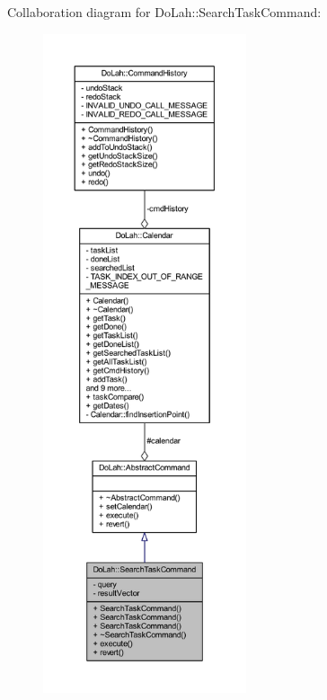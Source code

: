 Collaboration diagram for Do\+Lah\+:\+:Search\+Task\+Command\+:\nopagebreak
\begin{figure}[H]
\begin{center}
\leavevmode
\includegraphics[height=550pt]{class_do_lah_1_1_search_task_command__coll__graph}
\end{center}
\end{figure}
